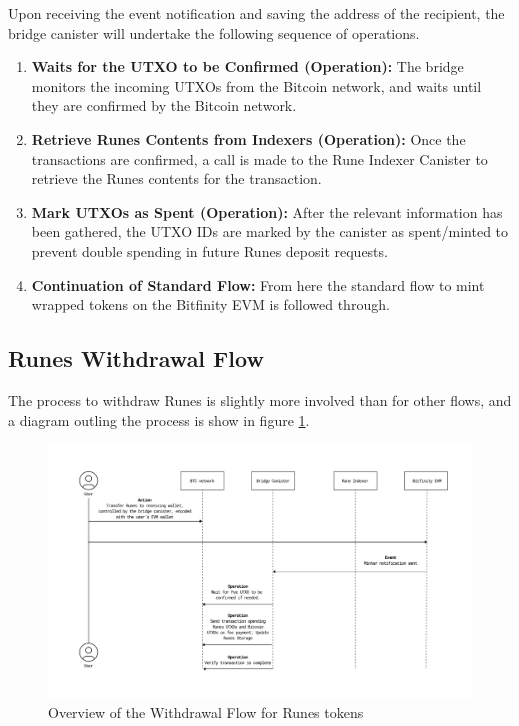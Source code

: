 \documentclass{article}
\begin{document}
Upon receiving the event notification and saving the address of the recipient, the bridge canister will undertake the following sequence of operations.

 \begin{enumerate}  
        \item{\textbf{Waits for the UTXO to be Confirmed (Operation):}} The bridge monitors the incoming UTXOs from the Bitcoin network, and waits until they are confirmed by the Bitcoin network.

        \item{\textbf{Retrieve Runes Contents from Indexers (Operation):}} Once the transactions are confirmed, a call is made to the Rune Indexer Canister to retrieve the Runes contents for the transaction.
        
        \item \textbf{Mark UTXOs as Spent (Operation):} After the relevant information has been gathered, the UTXO IDs are marked by the canister as spent/minted to prevent double spending in future Runes deposit requests.

        \item \textbf{Continuation of Standard Flow:} From here the standard flow to mint wrapped tokens on the Bitfinity EVM is followed through.

 \end{enumerate}
 
\subsection{Runes Withdrawal Flow}

The process to withdraw Runes is slightly more involved than for other flows, and a diagram outling the process is show in figure \ref{fig:runes_withdraw}.

\begin{figure}[H]
    \centering
    \includegraphics[width=1\textwidth]{runes_withdraw.png}
    \caption{Overview of the Withdrawal Flow for Runes tokens}
    \label{fig:runes_withdraw}
\end{figure}
\end{document}
